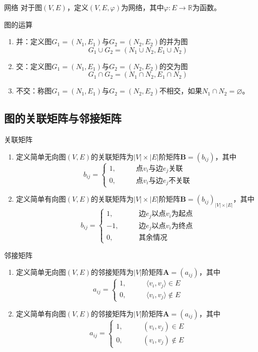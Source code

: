 \documentclass[lang = cn, scheme = chinese, thmcnt = section]{elegantbook}
\newcommand{\R}{\mathbb{R}}            %
\newcommand{\bs}{\boldsymbol}          %
\begin{document}
\begin{definition}{网络}
	对于图$(V,E)$，定义$(V,E,\varphi)$为网络，其中$\varphi:E\to\R$为函数。
\end{definition}

\begin{definition}{图的运算}
	\begin{enumerate}
		\item 并：定义图$G_1=(N_1,E_1)$与$G_2=(N_2,E_2)$的并为图%
		$$
		G_1\cup G_2=\left(N_1\cup N_2,E_1\cup N_2\right)
		$$
		\item 交：定义图$G_1=(N_1,E_1)$与$G_2=(N_2,E_2)$的交为图%
		$$
		G_1\cap G_2=\left(N_1\cap N_2,E_1\cap N_2\right)
		$$
		\item 不交：称图$G_1=(N_1,E_1)$与$G_2=(N_2,E_2)$不相交，如果$N_1\cap N_2=\varnothing$。
	\end{enumerate}
\end{definition}

\subsection{图的关联矩阵与邻接矩阵}

\begin{definition}{关联矩阵}
	\begin{enumerate}
		\item 定义简单无向图$(V,E)$的关联矩阵为$|V|\times |E|$阶矩阵$\bs{B}=(b_{ij})$，其中
		$$
		b_{ij}=\begin{cases}
			1,\qquad & \text{点}v_i\text{与边}e_j\text{关联}\\
			0,\qquad & \text{点}v_i\text{与边}e_j\text{不关联}
		\end{cases}
		$$
		\item 定义简单有向图$(V,E)$的关联矩阵为$|V|\times |E|$阶矩阵$\bs{B}=(b_{ij})_{|V|\times |E|}$，其中
		$$
		b_{ij}=\begin{cases}
			1,\qquad & \text{边}e_j\text{以点}v_i\text{为起点}\\
			-1,\qquad & \text{边}e_j\text{以点}v_i\text{为终点}\\
			0,\qquad & \text{其余情况}
		\end{cases}
		$$
	\end{enumerate}
\end{definition}

\begin{definition}{邻接矩阵}
	\begin{enumerate}
		\item 定义简单无向图$(V,E)$的邻接矩阵为$|V|$阶矩阵$\bs{A}=(a_{ij})$，其中
		$$
		a_{ij}=\begin{cases}
			1,\qquad & \langle v_i,v_j \rangle\in E\\
			0,\qquad & \langle v_i,v_j \rangle\notin E
		\end{cases}
		$$
		\item 定义简单有向图$(V,E)$的邻接矩阵为$|V|$阶矩阵$\bs{A}=(a_{ij})$，其中
		$$
		a_{ij}=\begin{cases}
			1,\qquad & (v_i,v_j)\in E\\
			0,\qquad & (v_i,v_j)\notin E
		\end{cases}
		$$
	\end{enumerate}
\end{definition}
\end{document}
